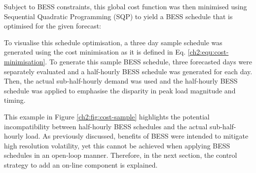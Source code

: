 Subject to BESS constraints, this global cost function was then minimised using Sequential Quadratic Programming (SQP) to yield a BESS schedule that is optimised for the given forecast:



To visualise this schedule optimisation, a three day sample schedule was generated using the cost minimisation as it is defined in Eq. \ref{ch2:equ:cost-minimisation}.
To generate this sample BESS schedule, three forecasted days were separately evaluated and a half-hourly BESS schedule was generated for each day.
Then, the actual sub-half-hourly demand was used and the half-hourly BESS schedule was applied to emphasise the disparity in peak load magnitude and timing.



This example in Figure \ref{ch2:fig:cost-sample} highlights the potential incompatibility between half-hourly BESS schedules and the actual sub-half-hourly load.
As previously discussed, benefits of BESS were intended to mitigate high resolution volatility, yet this cannot be achieved when applying BESS schedules in an open-loop manner.
Therefore, in the next section, the control strategy to add an on-line component is explained.




 